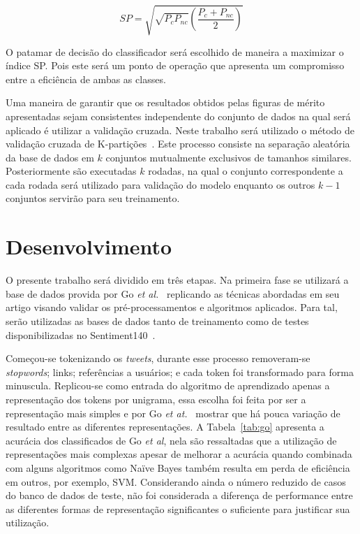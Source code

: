 \begin{equation} \label{eq:sp}
    SP = \sqrt{\sqrt{P_c P_{nc}} \left(\frac{P_c + P_{nc}}{2}\right)}
\end{equation}

O patamar de decisão do classificador será escolhido de maneira a maximizar o índice SP.
Pois este será um ponto de operação que apresenta um compromisso entre a eficiência de ambas as classes.

Uma maneira de garantir que os resultados obtidos pelas figuras de mérito apresentadas sejam consistentes independente do
conjunto de dados na qual será aplicado é utilizar a validação cruzada.
Neste trabalho será utilizado o método de validação cruzada de K-partições~\cite{kohavi95}.
Este processo consiste na separação aleatória da base de dados em $k$ conjuntos mutualmente exclusivos de tamanhos
similares.
Posteriormente são executadas $k$ rodadas, na qual o conjunto correspondente a cada rodada será utilizado para validação
do modelo enquanto os outros $k-1$ conjuntos servirão para seu treinamento.

\section{Desenvolvimento} \label{sec:desenvolvimento}

O presente trabalho será dividido em três etapas.
Na primeira fase se utilizará a base de dados provida por Go \textit{et al.}~\cite{go09} replicando as técnicas
abordadas em seu artigo visando validar os pré-processamentos e algoritmos aplicados.
Para tal, serão utilizadas as bases de dados tanto de treinamento como de testes disponibilizadas no
Sentiment140~\cite{go09}.

Começou-se tokenizando os \textit{tweets}, durante esse processo removeram-se \textit{stopwords}; links; referências a
usuários; e cada token foi transformado para forma minuscula.
Replicou-se como entrada do algoritmo de aprendizado apenas a representação dos tokens por unigrama, essa escolha foi
feita por ser a representação mais simples e por Go \textit{et at.}~\cite{go09} mostrar que há pouca variação de
resultado entre as diferentes representações.
A Tabela~\ref{tab:go} apresenta a acurácia dos classificados de Go \textit{et al}, nela são ressaltadas que a utilização
de representações mais complexas apesar de melhorar a acurácia quando combinada com alguns algoritmos como Naïve Bayes
também resulta em perda de eficiência em outros, por exemplo, SVM.
Considerando ainda o número reduzido de casos do banco de dados de teste, não foi considerada a diferença de performance
entre as diferentes formas de representação significantes o suficiente para justificar sua utilização.

